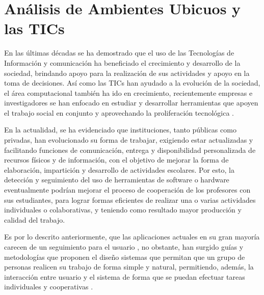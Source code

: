 \chapter{Análisis de Ambientes Ubicuos y las TICs}
En las últimas décadas se ha demostrado que el uso de las Tecnologías de Información y comunicación ha beneficiado el crecimiento y desarrollo de la sociedad, brindando apoyo para la realización de sus actividades y apoyo en la toma de decisiones. Así como las TICs han ayudado a la evolución de la sociedad, el área computacional también ha ido en crecimiento, recientemente empresas e investigadores se han enfocado en estudiar y desarrollar herramientas que apoyen el trabajo social en conjunto y aprovechando la proliferación tecnológica \citep{Duran2017}.

En la actualidad, se ha evidenciado que instituciones, tanto públicas como privadas, han evolucionado su forma de trabajar, exigiendo estar actualizadas y facilitando funciones de comunicación, entrega y disponibilidad personalizada de recursos físicos y de información, con el objetivo de mejorar la forma de elaboración, impartición y desarrollo de actividades escolares. Por esto, la detección y seguimiento del uso de herramientas de software o hardware eventualmente podrían mejorar el proceso de cooperación de los profesores con sus estudiantes, para lograr formas eficientes de realizar una o varias actividades individuales o colaborativas, y teniendo como resultado mayor producción y calidad del trabajo.

Es por lo descrito anteriormente, que las aplicaciones actuales en su gran mayoría carecen de un seguimiento para el usuario \cite{MontaneLuis;Toledo2015}, no obstante, han surgido guías y metodologías que proponen el diseño sistemas que permitan que un grupo de personas realicen su trabajo de forma simple y natural, permitiendo, además, la interacción entre usuario y el sistema de forma que se puedan efectuar tareas individuales y cooperativas \citep{LuisaM.LuisJ.VisitacionM.&Ramon2007}.
